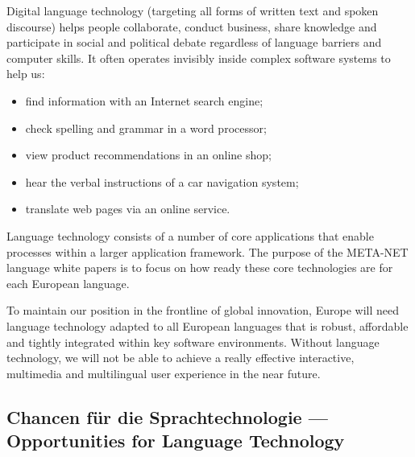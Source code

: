 \documentclass[]{../../metanetpaper}
\begin{document}
\begin{Parallel}[c]{80mm}{80mm}
{    Digital language technology (targeting all forms of written text and spoken discourse) helps people collaborate, conduct business, share knowledge and participate in social and political debate regardless of language barriers and computer skills. It often operates invisibly inside complex software systems to help us:
    \begin{itemize}
      \item find information with an Internet search engine;
      \item check spelling and grammar in a word processor;
      \item view product recommendations in an online shop;
      \item hear the verbal instructions of a car navigation system;
      \item translate web pages via an online service.
    \end{itemize}
    Language technology consists of a number of core applications that enable processes within a larger application framework. The purpose of the META-NET language white papers is to focus on how ready these core technologies are for each European language. 

    To maintain our position in the frontline of global innovation, Europe will need language technology adapted to all European languages that is robust, affordable and tightly integrated within key software environments. Without language technology, we will not be able to achieve a really effective interactive, multimedia and multilingual user experience in the near future.
  }
  
  \ParallelPar


  \subsection{Chancen für die Sprachtechnologie --- Opportunities for Language Technology }

\end{Parallel}
\end{document}
